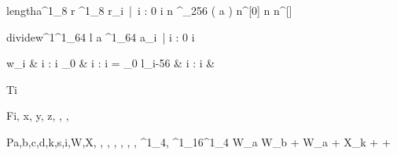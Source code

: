 \documentclass[12pt,a4paper]{book}
\begin{document}


\begin{eqcode}{length}{a}{}{^1_8}
    r \in {}^1_8 \lend
    r_i\  |\  i : 0 \leq i   \lend
    n ^{\lfloor \log_{256} \left ( a \right ) \rfloor } \lend
    n^{[0]} \gets n \lend
    n^{[\iter]} \gets {} \lend
     \lend
\end{eqcode}

\begin{eqcode}{divide}{w}{^1}{^1_{64}}
    l \gets {} \lend
    a \in {}^1_64 \lend
    a_i\   |  i : 0 \leq i \ \gets
        \begin{cases}
            w_i & i : i \leq {}_0 \lend
              & i : i = _0 \lend
            l_{i-56} & i : i   & \otherwise \lend
        \end{cases} \lend
     \lend
\end{eqcode}

\begin{eqcode}{T}{i}{}{}
     \lend
\end{eqcode}

\begin{eqcode}{F}{i, x, y, z}{, , ,
}{}
        \lend
       \lend
       \lend
       \lend
    \qendif
\end{eqcode}

\begin{eqcode}{P}{a,b,c,d,k,s,i,W,X}{, , ,
, , , , ^1_4,
^1_{16}}{^1_4}
    W_a \gets W_b + {W_a + X_k +   +
    } \lend
     \lend
\end{eqcode}
\end{document}
